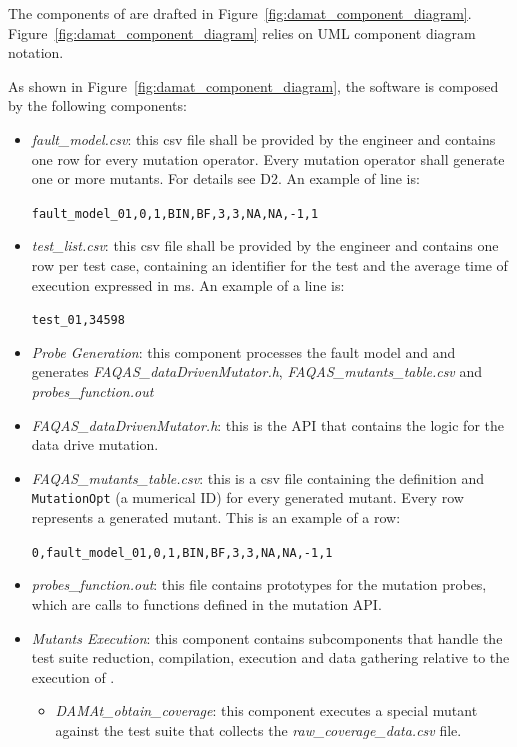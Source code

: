 The components of \dama are drafted in Figure~\ref{fig:damat_component_diagram}. Figure~\ref{fig:damat_component_diagram} relies on UML component diagram notation.

As shown in Figure~\ref{fig:damat_component_diagram}, the software is composed by the following components:

\begin{itemize}
  \item \textit{fault\_model.csv}: this csv file shall be provided by the engineer and contains one row for every mutation operator. Every mutation operator shall generate one or more mutants.
  For details see D2. An example of line is:

  \texttt{fault\_model\_01,0,1,BIN,BF,3,3,NA,NA,-1,1}

  \item \textit{test\_list.csv}: this csv file shall be provided by the engineer and contains one row per test case, containing an identifier for the test and the average time of execution expressed in ms. An example of a line is:

  \texttt{test\_01,34598}

  \item \textit{Probe  Generation}: this component processes the fault model and and generates \textit{FAQAS\_data\-DrivenMutator.h}, \textit{FAQAS\_mutants\_table.csv}  and \textit{probes\_function.out}
  \item \textit{FAQAS\_dataDrivenMutator.h}: this is the API that contains the logic for the data drive mutation.
  \item \textit{FAQAS\_mutants\_table.csv}: this is a csv file containing the definition and \texttt{MutationOpt} (a mumerical ID) for every generated mutant. Every row represents a generated mutant. This is an example of a row:

  \texttt{0,fault\_model\_01,0,1,BIN,BF,3,3,NA,NA,-1,1}

  \item \textit{probes\_function.out}: this file contains prototypes for the mutation probes, which are calls to functions defined in the mutation API.
  \item \textit{Mutants Execution}: this component contains subcomponents that handle the test suite reduction, compilation, execution and data gathering relative to the execution of \dama.
  \begin{itemize}
    \item \textit{DAMAt\_obtain\_coverage}: this component executes a special mutant against the test suite that collects the \textit{raw\_coverage\_data.csv} file.


\end{itemize}
\end{itemize}

